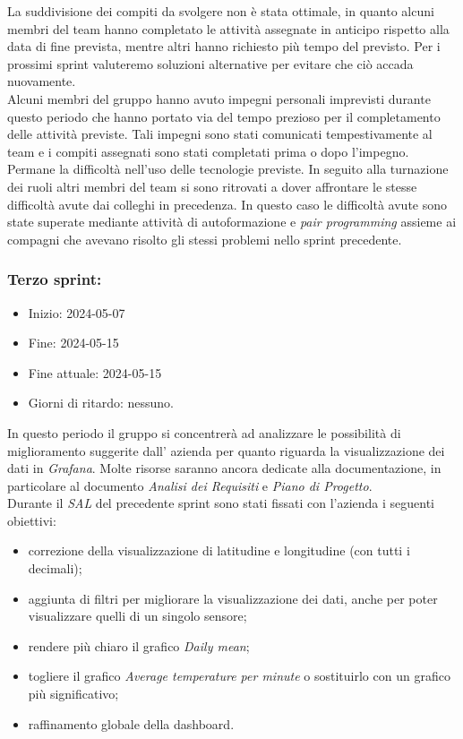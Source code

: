 La suddivisione dei compiti da svolgere non è stata ottimale, in quanto alcuni membri del team hanno completato le attività assegnate in anticipo rispetto alla data di fine prevista, mentre altri hanno richiesto più tempo del previsto. Per i prossimi sprint valuteremo soluzioni alternative per evitare che ciò accada nuovamente. \\
Alcuni membri del gruppo hanno avuto impegni personali imprevisti durante questo periodo che hanno portato via del tempo prezioso per il completamento delle attività previste. Tali impegni sono stati comunicati tempestivamente al team e i compiti assegnati sono stati completati prima o dopo l'impegno. \\
Permane la difficoltà nell'uso delle tecnologie previste. In seguito alla turnazione dei ruoli altri membri del team si sono ritrovati a dover affrontare le stesse difficoltà avute dai colleghi in precedenza. In questo caso le difficoltà avute sono state superate mediante attività di autoformazione e \textit{pair programming} assieme ai compagni che avevano risolto gli stessi problemi nello sprint precedente.

\newpage
\subsubsection{Terzo sprint:}
\begin{itemize}
    \item Inizio: 2024-05-07
    \item Fine: 2024-05-15
    \item Fine attuale: 2024-05-15
    \item Giorni di ritardo: nessuno.
\end{itemize}

In questo periodo il gruppo si concentrerà ad analizzare le possibilità di miglioramento suggerite dall' azienda per quanto riguarda la visualizzazione dei dati in \textit{Grafana}. Molte risorse saranno ancora dedicate alla documentazione, in particolare al documento \textit{Analisi dei Requisiti} e \textit{Piano di Progetto}. \\
Durante il \textit{SAL} del precedente sprint sono stati fissati con l'azienda i seguenti obiettivi:
\begin{itemize}
    \item correzione della visualizzazione di latitudine e longitudine (con tutti i decimali);
    \item aggiunta di filtri per migliorare la visualizzazione dei dati, anche per poter visualizzare quelli di un singolo sensore;
    \item rendere più chiaro il grafico \textit{Daily mean};
    \item togliere il grafico \textit{Average temperature per minute} o sostituirlo con un grafico più significativo;
    \item raffinamento globale della dashboard.
\end{itemize}


